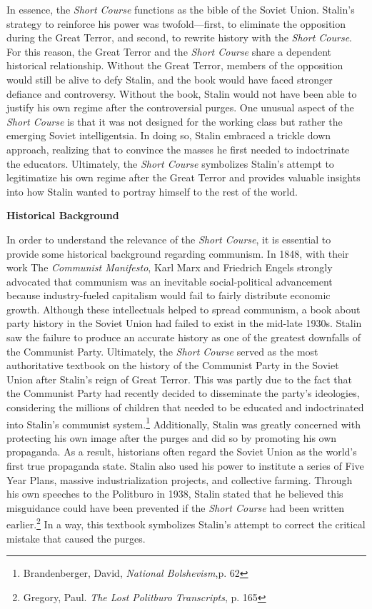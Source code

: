 \documentclass[a4paper, twocolumn]{article}
\begin{document}
In essence, the \emph{Short Course} functions as the bible of the
Soviet Union. Stalin's strategy to reinforce his power was
twofold—first, to eliminate the opposition during the Great
Terror, and second, to rewrite history with the \emph{Short
  Course}. For this reason, the Great Terror and the \emph{Short
  Course} share a dependent historical relationship. Without the
Great Terror, members of the opposition would still be alive
to defy Stalin, and the book would have faced stronger
defiance and controversy. Without the book, Stalin would not
have been able to justify his own regime after the
controversial purges. One unusual aspect of the \emph{Short Course}
is that it was not designed for the working class but rather
the emerging Soviet intelligentsia. In doing so, Stalin
embraced a trickle down approach, realizing that to convince
the masses he first needed to indoctrinate the
educators. Ultimately, the \emph{Short Course} symbolizes Stalin's
attempt to legitimatize his own regime after the Great Terror
and provides valuable insights into how Stalin wanted to
portray himself to the rest of the world.


\begin{center}\textbf{Historical Background}\end{center}

In order to understand the relevance of the \emph{Short Course}, it is
essential to provide some historical background regarding
communism. In 1848, with their work The \emph{Communist Manifesto}, Karl Marx
and Friedrich Engels strongly advocated that communism was an
inevitable social-political advancement because industry-fueled
capitalism would fail to fairly distribute economic growth. Although
these intellectuals helped to spread communism, a book about party history in the
Soviet Union had failed to exist in the mid-late 1930s. Stalin saw the
failure to produce an accurate history as one of the greatest
downfalls of the Communist Party. Ultimately, the \emph{Short Course} served
as the most authoritative textbook on the history of the Communist
Party in the Soviet Union after Stalin's reign of Great Terror. This
was partly due to the fact that the Communist Party had recently
decided to disseminate the party's ideologies, considering the
millions of children that needed to be educated and indoctrinated into
Stalin’s communist system.\footnote{Brandenberger, David, \emph{National Bolshevism},p. 62} Additionally, Stalin was greatly
concerned with protecting his own image after the purges and did so by
promoting his own propaganda. As a result, historians often regard the
Soviet Union as the world's first true propaganda state. Stalin also
used his power to institute a series of Five Year Plans, massive
industrialization projects, and collective farming. Through his own
speeches to the Politburo in 1938, Stalin stated that he believed this
misguidance could have been prevented if the \emph{Short Course} had been
written earlier.\footnote{Gregory, Paul. \emph{The Lost Politburo Transcripts}, p. 165} In a way, this textbook symbolizes Stalin’s
attempt to correct the critical mistake that caused the purges.
\end{document}
